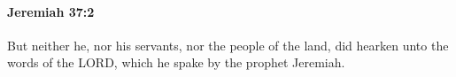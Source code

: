 
		\paragraph{Jeremiah 37:2} %
			\label{JEREMIAH-37-2}

			But neither he, nor his servants, nor the people of the land, did hearken unto the words of the LORD, which he spake by the prophet Jeremiah.


